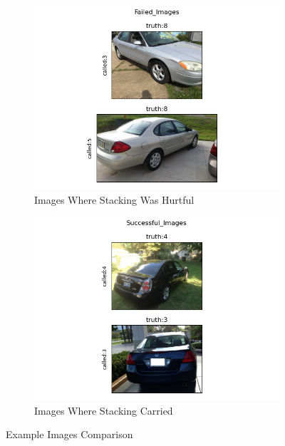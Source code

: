 \documentclass[12pt]{article}
\begin{document}
\begin{figure}
  \begin{subfigure}{.5\textwidth}
    \includegraphics[width=.95\textwidth]{../../Deliverable/Failed_Images.png}
      \caption{Images Where Stacking Was Hurtful}
      \end{subfigure}%
    \begin{subfigure}{.5\textwidth}
      \includegraphics[width=.95\textwidth]{../../Deliverable/Successful_Images.png}
      \caption{Images Where Stacking Carried}
    \end{subfigure}

    \caption{Example Images Comparison}
    \label{figure5}
\end{figure}

\end{document}
